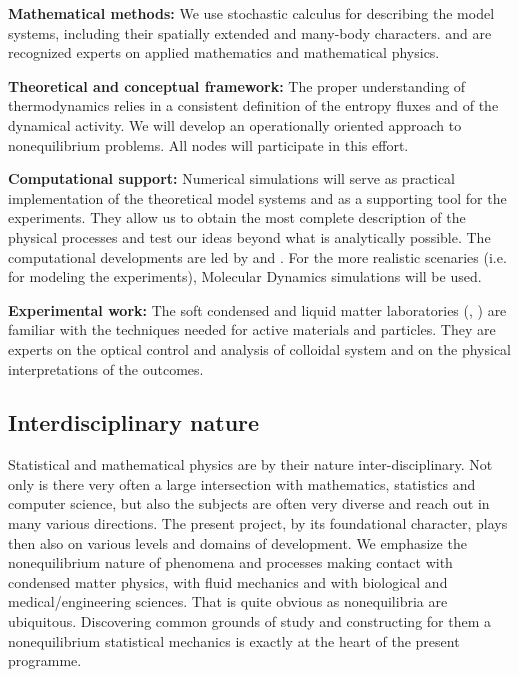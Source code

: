 \begin{asparaenum}
\item {\bf Mathematical methods:} We use stochastic calculus for describing the model
systems, including their spatially extended and many-body characters.
%
 and  are recognized experts on applied mathematics and
mathematical physics.
\item {\bf Theoretical and conceptual framework:} The proper understanding of thermodynamics
relies in a consistent definition of the entropy fluxes and of the dynamical activity.
%
We will develop an operationally oriented approach to nonequilibrium problems.
%
All nodes will participate in this effort.
\item {\bf Computational support:} Numerical simulations will serve as practical
implementation of the theoretical model systems and as a supporting tool for the
experiments.
%
They allow us to obtain the most complete description of the physical processes and test our ideas beyond what is analytically possible.
%
The computational developments are led by  and .
%
For the more realistic scenaries (i.e. for modeling the experiments), Molecular Dynamics
simulations will be used.
\item {\bf Experimental work:} The soft condensed and liquid matter laboratories
(, ) are familiar with the techniques needed for active materials
and particles.
%
They are experts on the optical control and analysis of colloidal system and on the physical interpretations of the outcomes.
\end{asparaenum}

\subsection{Interdisciplinary nature}\label{sec:interdisc}


Statistical and mathematical physics are by their nature inter-disciplinary.  Not
only is there very often a large intersection with mathematics, statistics and computer
science, but also the subjects are often very diverse and reach out in many various
directions.  The present project, by its foundational character, plays then also on various levels and domains of development. We emphasize the nonequilibrium nature of
phenomena and processes making contact with condensed matter physics, with
fluid mechanics and with biological and medical/engineering sciences.  That is quite obvious
as nonequilibria are ubiquitous.  Discovering common grounds of study and constructing for
them a nonequilibrium statistical mechanics is exactly  at the heart of the present programme.

